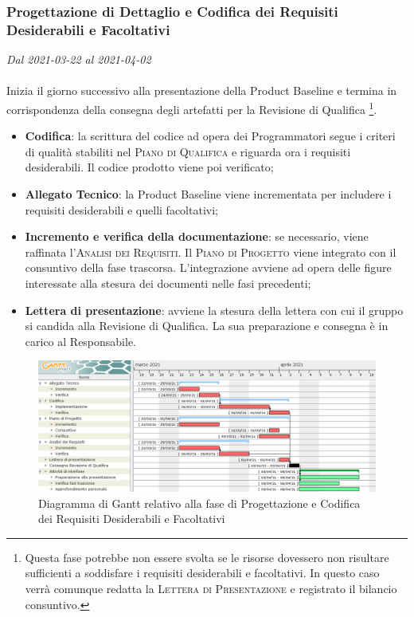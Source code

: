 \subsubsection{Progettazione di Dettaglio e Codifica dei Requisiti Desiderabili e Facoltativi}

\textit{Dal 2021-03-22 al 2021-04-02}
\\\\
Inizia il giorno successivo alla presentazione della Product Baseline e termina in corrispondenza della consegna degli artefatti per la Revisione di Qualifica \footnote{Questa fase potrebbe non essere svolta se le risorse dovessero non risultare sufficienti a soddisfare i requisiti desiderabili e facoltativi. In questo caso verrà comunque redatta la \textsc{Lettera di Presentazione} e registrato il bilancio consuntivo.}.
\begin{itemize}
	\item \textbf{Codifica}: la scrittura del codice ad opera dei Programmatori segue i criteri di qualità stabiliti nel \textsc{Piano di Qualifica} e riguarda ora i requisiti desiderabili. Il codice prodotto viene poi verificato;
	\item \textbf{Allegato Tecnico}: la Product Baseline viene incrementata per includere i requisiti desiderabili e quelli facoltativi;
	\item \textbf{Incremento e verifica della documentazione}: se necessario, viene raffinata l'\textsc{Analisi dei Requisiti}. Il \textsc{Piano di Progetto} viene integrato con il consuntivo della fase trascorsa. L'integrazione avviene ad opera delle figure interessate alla stesura dei documenti nelle fasi precedenti;
	\item \textbf{Lettera di presentazione}: avviene la stesura della lettera con cui il gruppo si candida alla Revisione di Qualifica. La sua preparazione e consegna è in carico al Responsabile.
	
\end{itemize}


\begin{figure}[H]
	\centering
	\includegraphics[scale=0.48]{res/images/05_gantt_codifica_desiderabili.png}
	\caption{Diagramma di Gantt relativo alla fase di Progettazione e Codifica dei Requisiti Desiderabili e Facoltativi}
\end{figure}




